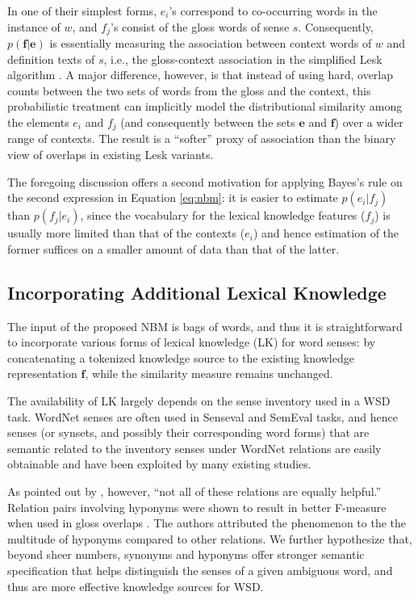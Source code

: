 \documentclass[11pt]{article}
\begin{document}
In one of their simplest forms, $e_i$'s correspond to co-occurring
words in the instance of $w$, and $f_j$'s consist of the gloss words
of sense $s$. Consequently, $p(\mathbf{f}|\mathbf{e})$ is essentially
measuring the association between context words of $w$ and definition
texts of $s$, i.e., the gloss-context association in the simplified
Lesk algorithm \citep{kilgarriff2000framework}. A major difference,
however, is that instead of using hard, overlap counts between the two
sets of words from the gloss and the context, this probabilistic
treatment can implicitly model the distributional similarity among the
elements $e_i$ and $f_j$ (and consequently between the sets
$\mathbf{e}$ and $\mathbf{f}$) over a wider range of contexts. The
result is a ``softer'' proxy of association than the binary view of
overlaps in existing Lesk variants.

The foregoing discussion offers a second motivation for applying
Bayes's rule on the second expression in Equation \eqref{eq:nbm}: it
is easier to estimate $p(e_i|f_j)$ than $p(f_j|e_i)$, since the
vocabulary for the lexical knowledge features ($f_j$) is usually more
limited than that of the contexts ($e_i$) and hence estimation of the
former suffices on a smaller amount of data than that of the latter.

\subsection{Incorporating Additional Lexical Knowledge}
\label{sec:incorp-addit-lexic}
The input of the proposed NBM is bags of words, and thus it is
straightforward to incorporate various forms of lexical knowledge (LK)
for word senses: by concatenating a tokenized knowledge source to the
existing knowledge representation $\mathbf{f}$, while the similarity
measure remains unchanged.

The availability of LK largely depends on the sense inventory used in
a WSD task. WordNet senses are often used in Senseval and SemEval
tasks, and hence senses (or synsets, and possibly their corresponding
word forms) that are semantic related to the inventory senses under
WordNet relations are easily obtainable and have been exploited by
many existing studies.

As pointed out by \citet{patwardhan_using_2003}, however, ``not all of
these relations are equally helpful.'' Relation pairs involving
hyponyms were shown to result in better F-measure when used in gloss
overlaps \citep{banerjee2003extended}. The authors attributed the
phenomenon to the the multitude of hyponyms compared to other
relations. We further hypothesize that, beyond sheer numbers, synonyms
and hyponyms offer stronger semantic specification that helps
distinguish the senses of a given ambiguous word, and thus are more
effective knowledge sources for WSD.
\end{document}
